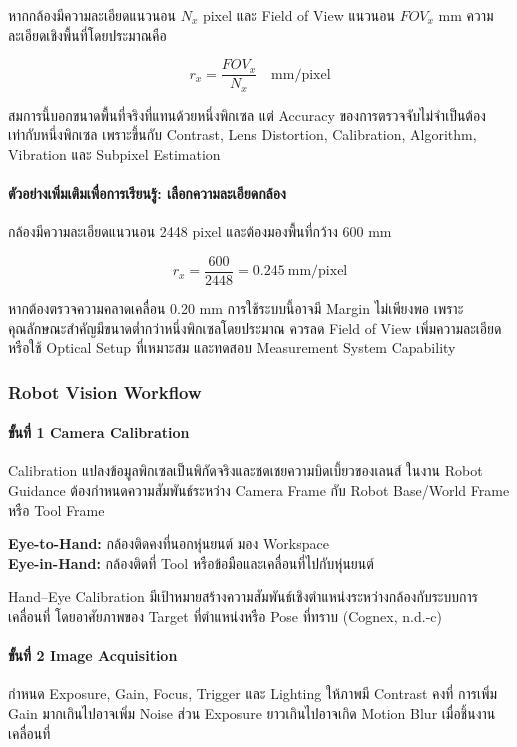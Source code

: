 หากกล้องมีความละเอียดแนวนอน $N_x$ pixel และ Field of View แนวนอน $FOV_x$ mm ความละเอียดเชิงพื้นที่โดยประมาณคือ

\[
r_x=\frac{FOV_x}{N_x}\quad \text{mm/pixel}
\]

สมการนี้บอกขนาดพื้นที่จริงที่แทนด้วยหนึ่งพิกเซล แต่ Accuracy ของการตรวจจับไม่จำเป็นต้องเท่ากับหนึ่งพิกเซล เพราะขึ้นกับ Contrast, Lens Distortion, Calibration, Algorithm, Vibration และ Subpixel Estimation

\paragraph{ตัวอย่างเพิ่มเติมเพื่อการเรียนรู้: เลือกความละเอียดกล้อง}

กล้องมีความละเอียดแนวนอน 2448 pixel และต้องมองพื้นที่กว้าง 600 mm

\[
r_x=\frac{600}{2448}=0.245\ \text{mm/pixel}
\]

หากต้องตรวจความคลาดเคลื่อน 0.20 mm การใช้ระบบนี้อาจมี Margin ไม่เพียงพอ เพราะคุณลักษณะสำคัญมีขนาดต่ำกว่าหนึ่งพิกเซลโดยประมาณ ควรลด Field of View เพิ่มความละเอียด หรือใช้ Optical Setup ที่เหมาะสม และทดสอบ Measurement System Capability

\subsubsection{Robot Vision Workflow}

\paragraph{ขั้นที่ 1 Camera Calibration}

Calibration แปลงข้อมูลพิกเซลเป็นพิกัดจริงและชดเชยความบิดเบี้ยวของเลนส์ ในงาน Robot Guidance ต้องกำหนดความสัมพันธ์ระหว่าง Camera Frame กับ Robot Base/World Frame หรือ Tool Frame

\textbf{Eye-to-Hand:} กล้องติดคงที่นอกหุ่นยนต์ มอง Workspace\\
\textbf{Eye-in-Hand:} กล้องติดที่ Tool หรือข้อมือและเคลื่อนที่ไปกับหุ่นยนต์

Hand–Eye Calibration มีเป้าหมายสร้างความสัมพันธ์เชิงตำแหน่งระหว่างกล้องกับระบบการเคลื่อนที่ โดยอาศัยภาพของ Target ที่ตำแหน่งหรือ Pose ที่ทราบ (Cognex, n.d.-c)

\paragraph{ขั้นที่ 2 Image Acquisition}

กำหนด Exposure, Gain, Focus, Trigger และ Lighting ให้ภาพมี Contrast คงที่ การเพิ่ม Gain มากเกินไปอาจเพิ่ม Noise ส่วน Exposure ยาวเกินไปอาจเกิด Motion Blur เมื่อชิ้นงานเคลื่อนที่

